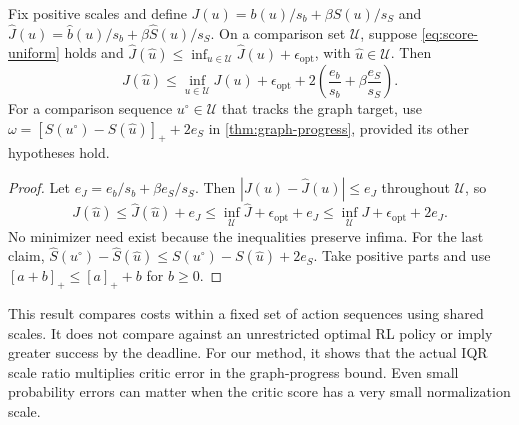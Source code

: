 \documentclass{article} %
\theoremstyle{definition}
\theoremstyle{remark}
\begin{document}
\begin{proposition}
\label{prop:candidate-regret}
Fix positive scales and define
$J(u)=b(u)/s_b+\beta S(u)/s_S$ and
$\widehat J(u)=\widehat b(u)/s_b+\beta\widehat S(u)/s_S$.
On a comparison set $\mathcal U$, suppose \cref{eq:score-uniform} holds and
$\widehat J(\hat u)\le\inf_{u\in\mathcal U}\widehat J(u)+\epsilon_{\mathrm{opt}}$,
with $\hat u\in\mathcal U$. Then
\begin{equation}
 J(\hat u)\le\inf_{u\in\mathcal U}J(u)+\epsilon_{\mathrm{opt}}
             +2\left(\frac{e_b}{s_b}+\beta\frac{e_S}{s_S}\right).
 \label{eq:candidate-regret}
\end{equation}
For a comparison sequence $u^\circ\in\mathcal U$ that tracks the graph target, use
$\omega=[S(u^\circ)-S(\hat u)]_++2e_S$ in \cref{thm:graph-progress},
provided its other hypotheses hold.
\end{proposition}
\begin{proof}
Let $e_J=e_b/s_b+\beta e_S/s_S$.
Then $|J(u)-\widehat J(u)|\le e_J$ throughout $\mathcal U$, so
\[
 J(\hat u)\le\widehat J(\hat u)+e_J
 \le\inf_{\mathcal U}\widehat J+\epsilon_{\mathrm{opt}}+e_J
 \le\inf_{\mathcal U}J+\epsilon_{\mathrm{opt}}+2e_J .
\]
No minimizer need exist because the inequalities preserve infima.
For the last claim,
$\widehat S(u^\circ)-\widehat S(\hat u)
 \le S(u^\circ)-S(\hat u)+2e_S$.
Take positive parts and use $[a+b]_+\le[a]_++b$ for $b\ge0$.
\end{proof}
This result compares costs within a fixed set of action sequences using shared scales.
It does not compare against an unrestricted optimal RL policy or imply greater
success by the deadline. For our method, it shows that the actual IQR scale ratio
multiplies critic error in the graph-progress bound. Even small probability errors
can matter when the critic score has a very small normalization scale.
\end{document}
